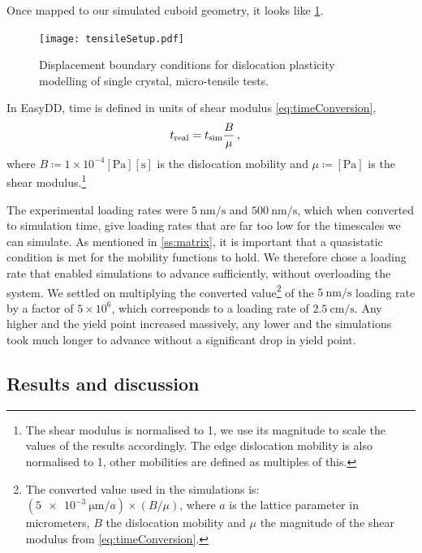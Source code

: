 Once mapped to our simulated cuboid geometry, it looks like \cref{f:tensileSetup}.
\begin{figure}
    \centering
    \texttt{[image: tensileSetup.pdf]}
    \caption[Displacement boundary conditions for dislocation plasticity modelling of single crystal, micro-tensile tests.]{Displacement boundary conditions for dislocation plasticity modelling of single crystal, micro-tensile tests.}
    \label{f:tensileSetup}
\end{figure}

In EasyDD, time is defined in units of shear modulus \cref{eq:timeConversion},
\begin{align}\label{eq:timeConversion}
    t_{\textrm{real}} & = t_{\textrm{sim}} \dfrac{B}{\mu}\,,
\end{align}
where $B \coloneqq 1 \times 10^{-4}[\si{\pascal}][\si{\second}]$ is the dislocation mobility and $\mu \coloneqq [\si{\pascal}]$ is the shear modulus.\footnote{The shear modulus is normalised to 1, we use its magnitude to scale the values of the results accordingly. The edge dislocation mobility is also normalised to 1, other mobilities are defined as multiples of this.}

The experimental loading rates were $\SI{5}{\nano\metre\per\second}$ and $\SI{500}{\nano\metre\per\second}$, which when converted to simulation time, give loading rates that are far too low for the timescales we can simulate. As mentioned in \cref{ss:matrix}, it is important that a quasistatic condition is met for the mobility functions to hold. We therefore chose a loading rate that enabled simulations to advance sufficiently, without overloading the system. We settled on multiplying the converted value\footnote{The converted value used in the simulations is: $\left(\SI{5e-3}{\micro\metre}/a\right) \times \left(B /  \mu \right)$, where $a$ is the lattice parameter in micrometers, $B$ the dislocation mobility and $ \mu $ the magnitude of the shear modulus from \cref{eq:timeConversion}.} of the $\SI{5}{\nano\metre\per\second}$ loading rate by a factor of $5 \times 10^6$, which corresponds to a loading rate of $\SI{2.5}{\centi\metre\per\second}$. Any higher and the yield point increased massively, any lower and the simulations took much longer to advance without a significant drop in yield point.

\subsection{Results and discussion}
\label{sc:NiResults}

